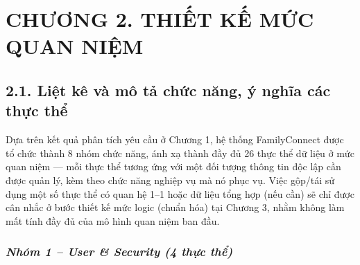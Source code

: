 \hypertarget{chux1b0ux1a1ng-2.-thiux1ebft-kux1ebf-mux1ee9c-quan-niux1ec7m}{%
\section{\texorpdfstring{\textbf{CHƯƠNG 2. THIẾT KẾ MỨC QUAN NIỆM}}{CHƯƠNG 2. THIẾT KẾ MỨC QUAN NIỆM}}\label{chux1b0ux1a1ng-2.-thiux1ebft-kux1ebf-mux1ee9c-quan-niux1ec7m}}

\hypertarget{liux1ec7t-kuxea-vuxe0-muxf4-tux1ea3-chux1ee9c-nux103ng-uxfd-nghux129a-cuxe1c-thux1ef1c-thux1ec3}{%
\subsection{\texorpdfstring{\textbf{2.1. Liệt kê và mô tả chức năng, ý nghĩa các thực thể}}{2.1. Liệt kê và mô tả chức năng, ý nghĩa các thực thể}}\label{liux1ec7t-kuxea-vuxe0-muxf4-tux1ea3-chux1ee9c-nux103ng-uxfd-nghux129a-cuxe1c-thux1ef1c-thux1ec3}}

Dựa trên kết quả phân tích yêu cầu ở Chương 1, hệ thống FamilyConnect được tổ chức thành 8 nhóm chức năng, ánh xạ thành đầy đủ 26 thực thể dữ liệu ở mức quan niệm --- mỗi thực thể tương ứng với một đối tượng thông tin độc lập cần được quản lý, kèm theo chức năng nghiệp vụ mà nó phục vụ. Việc gộp/tái sử dụng một số thực thể có quan hệ 1--1 hoặc dữ liệu tổng hợp (nếu cần) sẽ chỉ được cân nhắc ở bước thiết kế mức logic (chuẩn hóa) tại Chương 3, nhằm không làm mất tính đầy đủ của mô hình quan niệm ban đầu.

\hypertarget{nhuxf3m-1-user-security-4-thux1ef1c-thux1ec3}{%
\subsubsection{\texorpdfstring{\emph{\textbf{Nhóm 1 -- User \& Security (4 thực thể)}}}{Nhóm 1 -- User \& Security (4 thực thể)}}\label{nhuxf3m-1-user-security-4-thux1ef1c-thux1ec3}}

